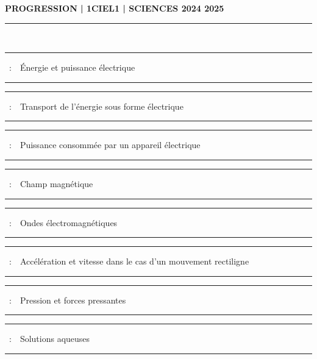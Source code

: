 \documentclass[11pt,a4paper]{article}
\newcounter{numchap}%
\newcommand{\chap}[1]{%
\addtocounter{numchap}{1}%
\textcolor{black}{Chapitre\,\thenumchap\,}\,#1%
}
\newcommand{\chapitre}[1]
{


\hrule
\vspace{5mm}
\large{ \chap~:~~#1 }
\vspace{5mm}
\hrule

\vfill 

}
\begin{document}
\center \LARGE{ \textbf{PROGRESSION | 1CIEL1 | SCIENCES 2024 2025}}
\\[0,5cm]

\normalsize

\hrule\

\vspace{1cm}

\begin{center}


\chapitre{Énergie et puissance électrique}
\chapitre{Transport de l'énergie sous forme électrique}
\chapitre{Puissance consommée par un appareil électrique}
\chapitre{Champ magnétique}
\chapitre{Ondes électromagnétiques}
\chapitre{Accélération et vitesse dans le cas d'un mouvement rectiligne}
\chapitre{Pression et forces pressantes}
\chapitre{Solutions aqueuses}



\end{center}
\end{document}
